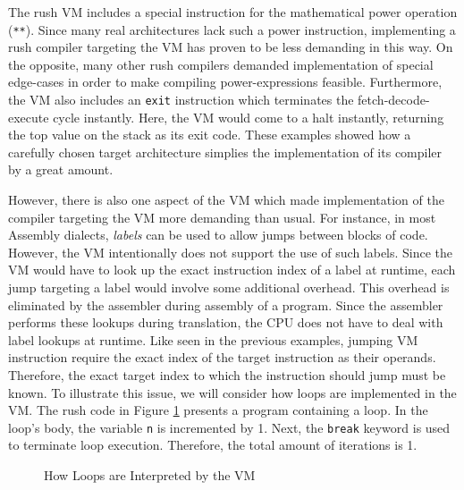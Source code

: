 The rush VM includes a special instruction for the mathematical power operation (\texttt{**}).
Since many real architectures lack such a power instruction,
implementing a rush compiler targeting the VM has proven to be less demanding in this way.
On the opposite, many other rush compilers demanded implementation of special edge-cases in order to make compiling power-expressions feasible.
Furthermore, the VM also includes an \texttt{exit} instruction which terminates the fetch-decode-execute cycle instantly.
Here, the VM would come to a halt instantly, returning the top value on the stack as its exit code.
These examples showed how a carefully chosen target architecture simplies the implementation of its compiler by a great amount.

However, there is also one aspect of the VM which made implementation of the compiler targeting the VM more demanding than usual.
For instance, in most Assembly dialects, \emph{labels} can be used to allow jumps between blocks of code.
However, the VM intentionally does not support the use of such labels.
Since the VM would have to look up the exact instruction index of a label at runtime,
each jump targeting a label would involve some additional overhead.
This overhead is eliminated by the assembler during assembly of a program.
Since the assembler performs these lookups during translation,
the CPU does not have to deal with label lookups at runtime.
Like seen in the previous examples, jumping VM instruction require the exact index of the target instruction as their operands.
Therefore, the exact target index to which the instruction should jump must be known.
To illustrate this issue, we will consider how loops are implemented in the VM.
The rush code in Figure \ref{fig:vm_loops} presents a program containing a loop.
In the loop's body, the variable \texttt{n} is incremented by 1.
Next, the \texttt{break} keyword is used to terminate loop execution.
Therefore, the total amount of iterations is 1.

\noindent
\begin{figure}[h]
	\begin{minipage}{.5\textwidth}
		\centering
	\end{minipage}%
	\begin{minipage}{.5\textwidth}
		\centering
	\end{minipage}
	\caption{How Loops are Interpreted by the VM}
	\label{fig:vm_loops}
\end{figure}

